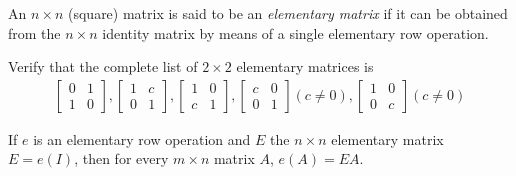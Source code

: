 \documentclass[12pt,letterpaper,reqno]{article}
\numberwithin{equation}{section}
\newcommand{\ti}[1]{\textit{#1}}
\begin{document}
\begin{defn}\label{def:elementary_matrix}
	An $n \times n$ (square) matrix is said to be an \ti{elementary matrix} if it can be obtained from the $n \times n$ identity matrix by means of a single elementary row operation.
\end{defn}

\begin{exercise}
Verify that the complete list of $2 \times 2$ elementary matrices is 
	\begin{align*}
	\begin{bmatrix}
		0 & 1 \\ 1 & 0
	\end{bmatrix}, \begin{bmatrix}
		1 & c \\ 0 & 1
	\end{bmatrix}, \begin{bmatrix}
		1 & 0 \\ c & 1
	\end{bmatrix}, 
	 \begin{bmatrix}
		c & 0 \\ 0 & 1
	\end{bmatrix} (c \neq 0), \begin{bmatrix}
		1 & 0 \\ 0 & c
	\end{bmatrix} (c \neq 0)
\end{align*}
\end{exercise}

\begin{thm}
If $e$ is an elementary row operation and $E$ the $n \times n$ elementary matrix $E=e(I)$, then for every $m \times n$ matrix $A$, $e(A)=EA$.	
\end{thm}
\end{document}
